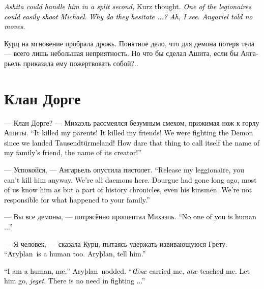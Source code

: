 \documentclass[a4paper,12pt,fleqn]{book}\usepackage{cooltooltips}\usepackage{polyglossia}\setdefaultlanguage[babelshorthands=true]{russian}\setotherlanguage{english}\defaultfontfeatures{Ligatures=TeX,Mapping=tex-text} \usepackage{xcolor}\definecolor{lightgray}{HTML}{bbbbbb}\color{lightgray}\newcommand{\ml}[3]{\textenglish{\textcolor{black}{#3}}}
\newcommand{\Arythlan}{Aryþlan}
\begin{document}
\ml{$0$}
{<<Ашита мог бы справиться с ним в долю секунды, --- думала Курц.}
{\textit{Ashita could handle him in a split second,} Kurz thought.}
\ml{$0$}
{--- Кто-то из легионеров может легко пристрелить Михаэля.}
{\textit{One of the legionaires could easily shoot Michael.}}
\ml{$0$}
{Почему же они медлят?..}
{\textit{Why do they hesitate ...?}}
\ml{$0$}
{А, ясно.}
{\textit{Ah, I see.}}
\ml{$0$}
{Ангарьель велела ничего не предпринимать>>.}
{\textit{Angariel told no moves.}}

Курц на мгновение пробрала дрожь.
Понятное дело, что для демона потеря тела --- всего лишь небольшая неприятность.
Но что бы сделал Ашита, если бы Ангарьель приказала ему пожертвовать собой?..

\section{Клан Дорге}

--- Клан Дорге? --- Михаэль рассмеялся безумным смехом, прижимая нож к горлу Ашиты.
\ml{$0$}
{--- Он убил моих родителей!}
{``It killed my parents!}
\ml{$0$}
{Он убил моих друзей!}
{It killed my friends!}
\ml{$0$}
{Мы вели с Демоном войну с того момента, как ступили на Таузендтурмеланд!}
{We were fighting the Demon since we landed Tausendt\"{u}rmeland!}
\ml{$0$}
{Как смеет это существо называться именем друга моей семьи, своего создателя?}
{How dare that thing to call itself the name of my family's friend, the name of its creator!''}

--- Успокойся, --- Ангарьель опустила пистолет.
\ml{$0$}
{--- Отпусти моего легионера, ты всё равно не сможешь его убить.}
{``Release my leggionaire, you can't kill him anyway.}
\ml{$0$}
{Мы все здесь демоны.}
{We're all daemons here.}
\ml{$0$}
{Дорге давно уже нет в живых, многие из нас знают о нём лишь из исторических хроник, даже члены его клана.}
{Dourgue had gone long ago, most of us know him as but a part of history chronicles, even his kinsmen.}
\ml{$0$}
{Мы не виноваты в том, что случилось с твоей семьёй.}
{We're not responsible for what happened to your family.''}

--- Вы все демоны, --- потрясённо прошептал Михаэль.
\ml{$0$}
{--- Никто из вас не человек...}
{``No one of you is human ...''}

--- Я человек, --- сказала Курц, пытаясь удержать извивающуюся Грету.
\ml{$0$}
{--- Арслан --- тоже человек.}
{``\Arythlan\ is a human too.}
\ml{$0$}
{Арслан, скажи ему.}
{\Arythlan, tell him.''}

\ml{$0$}
{--- Я человек, нэй, --- закивал Арслан.}
{``I am a human, n\ae{},'' \Arythlan\ nodded.}
\ml{$0$}
{--- Меня эсей выносила, атай воспитал.}
{``\textit{\OE{}s\ae{}} carried me, \textit{at\ae{}} teached me.}
\ml{$0$}
{Отпусти его, егет.}
{Let him go, \textit{jeget}.}
\ml{$0$}
{Не надо драться...}
{There is no need in fighting ...''}
\end{document}
